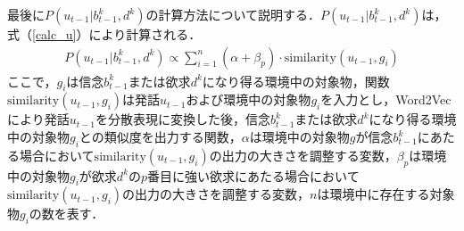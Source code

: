 \par
最後に$P(u_{t-1}|b_{t-1}^k,d^k)$の計算方法について説明する．$P(u_{t-1}|b_{t-1}^k,d^k)$は，式（\ref{calc_u}）により計算される．
\begin{equation}
  \begin{split}
  \label{calc_u}
  P(u_{t-1}|b_{t-1}^k,d^k)\propto \sum_{i=1}^n(\alpha+\beta_p)\cdot\mathrm{similarity}(u_{t-1},g_i)
  \end{split}
\end{equation}
ここで，$g_i$は信念$b_{t-1}^k$または欲求$d^k$になり得る環境中の対象物，関数$\mathrm{similarity}(u_{t-1},g_i)$は発話$u_{t-1}$および環境中の対象物$g_i$を入力とし，Word2Vec \cite{mikolov2013efficient}により発話$u_{t-1}$を分散表現に変換した後，信念$b_{t-1}^k$または欲求$d^k$になり得る環境中の対象物$g_i$との類似度を出力する関数，$\alpha$は環境中の対象物$g$が信念$b_{t-1}^k$にあたる場合において$\mathrm{similarity}(u_{t-1},g_i)$の出力の大きさを調整する変数，$\beta_p$は環境中の対象物$g_i$が欲求$d^k$の$p$番目に強い欲求にあたる場合において$\mathrm{similarity}(u_{t-1},g_i)$の出力の大きさを調整する変数，$n$は環境中に存在する対象物$g_i$の数を表す．

